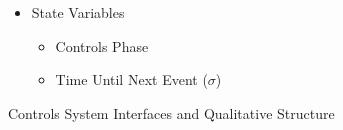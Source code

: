 \documentclass[10pt]{article}
\begin{document}
\begin{figure}[H]
{\begin{minipage}{0.98\textwidth}
\begin{minipage}{0.48\textwidth}
\begin{small}
\begin{itemize}
\begin{itemize}
  \item Indicators Timeout - Internal State Transition
  \end{itemize}
\item State Variables
  \begin{itemize}
  \item Controls Phase
  \item Time Until Next Event ($\sigma$)
  \end{itemize}
\end{itemize}
\end{small}
  \vfill
  \end{minipage}
\end{minipage}}
\caption{Controls System Interfaces and Qualitative Structure}
\label{fig:IOFO2}
\end{figure}

\vspace{0.2cm}
\end{document}

